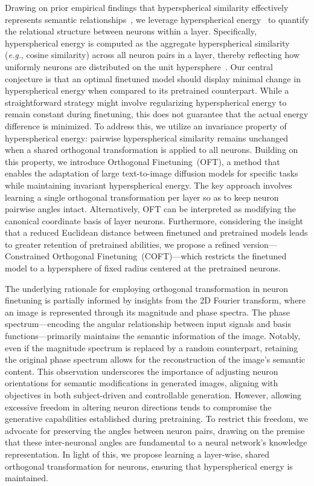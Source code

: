 Drawing on prior empirical findings that hyperspherical similarity effectively represents semantic relationships~\cite{liu2017deep,liu2018decoupled,chen2020angular}, we leverage hyperspherical energy~\cite{liu2018learning} to quantify the relational structure between neurons within a layer. Specifically, hyperspherical energy is computed as the aggregate hyperspherical similarity (\emph{e.g.}, cosine similarity) across all neuron pairs in a layer, thereby reflecting how uniformly neurons are distributed on the unit hypersphere~\cite{liu2021learning}. Our central conjecture is that an optimal finetuned model should display minimal change in hyperspherical energy when compared to its pretrained counterpart. While a straightforward strategy might involve regularizing hyperspherical energy to remain constant during finetuning, this does not guarantee that the actual energy difference is minimized. To address this, we utilize an invariance property of hyperspherical energy: pairwise hyperspherical similarity remains unchanged when a shared orthogonal transformation is applied to all neurons. Building on this property, we introduce Orthogonal Finetuning~(OFT), a method that enables the adaptation of large text-to-image diffusion models for specific tasks while maintaining invariant hyperspherical energy. The key approach involves learning a single orthogonal transformation per layer so as to keep neuron pairwise angles intact. Alternatively, OFT can be interpreted as modifying the canonical coordinate basis of layer neurons. Furthermore, considering the insight that a reduced Euclidean distance between finetuned and pretrained models leads to greater retention of pretrained abilities, we propose a refined version—Constrained Orthogonal Finetuning~(COFT)—which restricts the finetuned model to a hypersphere of fixed radius centered at the pretrained neurons.

The underlying rationale for employing orthogonal transformation in neuron finetuning is partially informed by insights from the 2D Fourier transform, where an image is represented through its magnitude and phase spectra. The phase spectrum—encoding the angular relationship between input signals and basis functions—primarily maintains the semantic information of the image. Notably, even if the magnitude spectrum is replaced by a random counterpart, retaining the original phase spectrum allows for the reconstruction of the image's semantic content. This observation underscores the importance of adjusting neuron orientations for semantic modifications in generated images, aligning with objectives in both subject-driven and controllable generation. However, allowing excessive freedom in altering neuron directions tends to compromise the generative capabilities established during pretraining. To restrict this freedom, we advocate for preserving the angles between neuron pairs, drawing on the premise that these inter-neuronal angles are fundamental to a neural network's knowledge representation. In light of this, we propose learning a layer-wise, shared orthogonal transformation for neurons, ensuring that hyperspherical energy is maintained.

